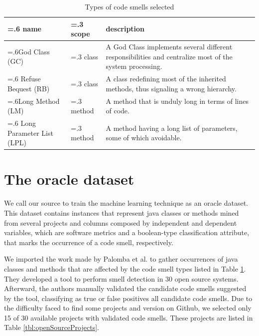 \begin{table}[ht]
\centering
\setlength{\extrarowheight}{0pt}
\addtolength{\extrarowheight}{\aboverulesep}
\addtolength{\extrarowheight}{\belowrulesep}
\setlength{\aboverulesep}{0pt}
\setlength{\belowrulesep}{0pt}
\caption{Types of code smells selected \cite{fowler1999refactoring}}
\label{tbl:codeSmellTypes}
\begin{tabularx}{\columnwidth}{>{\hsize=.6\hsize}X>{\hsize=.3\hsize}X>{\hsize=1.1\hsize}X}
\toprule
\rowcolor[rgb]{0.753,0.753,0.753}  \textbf{name}      & \textbf{scope}      & \textbf{description}            \\ 
\toprule
God Class (GC)                                             & class & A God Class implements several different responsibilities and centralize most of the system processing.  \\
\rowcolor[rgb]{0.753,0.753,0.753} Refuse Bequest (RB)      & class & A class redefining most of the inherited methods, thus signaling a wrong hierarchy.                      \\
Long Method (LM)                                       & method & A method that is unduly long in terms of lines of code.                                                  \\
\rowcolor[rgb]{0.753,0.753,0.753} Long Parameter List (LPL)& method & A method having a long list of parameters, some of which avoidable.                                      \\
\bottomrule
\end{tabularx}
\end{table}

\section{The oracle dataset}

We call our source to train the machine learning technique as an oracle dataset. This dataset contains instances that represent java classes or methods mined from several projects and columns composed by independent and dependent variables, which are software metrics and a boolean-type classification attribute, that marks the occurrence of a code smell, respectively. 

We imported the work made by Palomba et al. \cite{palomba2018diffuseness} to gather occurrences of java classes and methods that are affected by the code smell types listed in Table \ref{tbl:codeSmellTypes}. They developed a tool to perform smell detection in 30 open source systems. Afterward, the authors manually validated the candidate code smells suggested by the tool, classifying as true or false positives all candidate code smells. Due to the difficulty faced to find some projects and version on Github, we selected only 15 of 30 available projects with validated code smells. These projects are listed in Table \ref{tbl:openSourceProjects}. 

